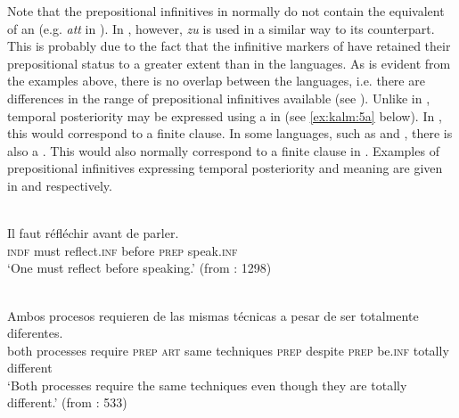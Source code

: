 \documentclass[output=paper]{langscibook}
\begin{document}
Note that the prepositional infinitives in  normally do not contain the equivalent of an  (e.g. \textit{att} in ). In , however, \textit{zu} is used in a similar way to its  counterpart. This is probably due to the fact that the infinitive markers of  have retained their prepositional status to a greater extent than in the  languages. As is evident from the examples above, there is no  overlap between the languages, i.e. there are differences in the range of prepositional infinitives available (see \citealt{Hengenveld1998}). Unlike in , temporal posteriority may be expressed using a  in  (see \ref{ex:kalm:5a} below). In , this would correspond to a finite clause. In some  languages, such as  and , there is also a . This would also normally correspond to a finite clause in . Examples of  prepositional infinitives expressing temporal posteriority and  meaning are given in  and  respectively. 


\ea
\label{ex:kalm:5}
\ea {}\label{ex:kalm:5a}\\ 
\gll Il faut réfléchir avant de parler.\\
\textsc{indf} must reflect.\textsc{inf} before \textsc{prep} speak.\textsc{inf}\\
\glt ‘One must reflect before speaking.’ (from \citealt{Grevisse1993}: 1298) 

\ex {}\label{ex:kalm:5b}\\ 
\gll Ambos procesos requieren de las mismas técnicas a pesar de ser totalmente diferentes.\\
both processes require \textsc{prep} \textsc{art} same techniques \textsc{prep} despite \textsc{prep} be.\textsc{inf} totally different\\
\glt ‘Both processes require the same techniques even though they are totally different.’ (from \citealt{Schulte2007What}: 533)
\z 
\z 
\end{document}
